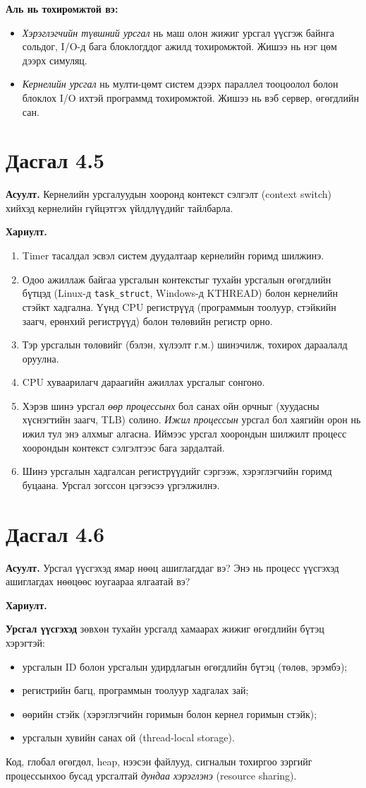 \documentclass[12pt,a4paper]{article}
\newcommand{\question}[2]{\section{Дасгал #1}\textbf{Асуулт.} #2\par\medskip\textbf{Хариулт.}\par}
\begin{document}
\textbf{Аль нь тохиромжтой вэ:}
\begin{itemize}[leftmargin=1.5em]
  \item \emph{Хэрэглэгчийн түвшний урсгал} нь маш олон жижиг урсгал үүсгэж байнга сольдог, I/O-д бага блоклогддог ажилд тохиромжтой. Жишээ нь нэг цөм дээрх симуляц.
  \item \emph{Кернелийн урсгал} нь мулти-цөмт систем дээрх параллел тооцоолол болон блоклох I/O ихтэй программд тохиромжтой. Жишээ нь вэб сервер, өгөгдлийн сан.
\end{itemize}

\question{4.5}{Кернелийн урсгалуудын хооронд контекст сэлгэлт (context switch) хийхэд кернелийн гүйцэтгэх үйлдлүүдийг тайлбарла.}

\begin{enumerate}[leftmargin=1.5em]
  \item Timer тасалдал эсвэл систем дуудалтаар кернелийн горимд шилжинэ.
  \item Одоо ажиллаж байгаа урсгалын контекстыг тухайн урсгалын өгөгдлийн бүтцэд (Linux-д \texttt{task\_struct}, Windows-д KTHREAD) болон кернелийн стэйкт хадгална. Үүнд CPU регистрүүд (программын тоолуур, стэйкийн заагч, ерөнхий регистрүүд) болон төлөвийн регистр орно.
  \item Тэр урсгалын төлөвийг (бэлэн, хүлээлт г.м.) шинэчилж, тохирох дараалалд оруулна.
  \item CPU хуваарилагч дараагийн ажиллах урсгалыг сонгоно.
  \item Хэрэв шинэ урсгал \emph{өөр процессынх} бол санах ойн орчныг (хуудасны хүснэгтийн заагч, TLB) солино. \emph{Ижил процессын} урсгал бол хаягийн орон нь ижил тул энэ алхмыг алгасна. Иймээс урсгал хоорондын шилжилт процесс хоорондын контекст сэлгэлтээс бага зардалтай.
  \item Шинэ урсгалын хадгалсан регистрүүдийг сэргээж, хэрэглэгчийн горимд буцаана. Урсгал зогссон цэгээсээ үргэлжилнэ.
\end{enumerate}

\question{4.6}{Урсгал үүсгэхэд ямар нөөц ашиглагддаг вэ? Энэ нь процесс үүсгэхэд ашиглагдах нөөцөөс юугаараа ялгаатай вэ?}

\textbf{Урсгал үүсгэхэд} зөвхөн тухайн урсгалд хамаарах жижиг өгөгдлийн бүтэц хэрэгтэй:
\begin{itemize}[leftmargin=1.5em]
  \item урсгалын ID болон урсгалын удирдлагын өгөгдлийн бүтэц (төлөв, эрэмбэ);
  \item регистрийн багц, программын тоолуур хадгалах зай;
  \item өөрийн стэйк (хэрэглэгчийн горимын болон кернел горимын стэйк);
  \item урсгалын хувийн санах ой (thread-local storage).
\end{itemize}
Код, глобал өгөгдөл, heap, нээсэн файлууд, сигналын тохиргоо зэргийг процессынхоо бусад урсгалтай \emph{дундаа хэрэглэнэ} (resource sharing).
\end{document}

